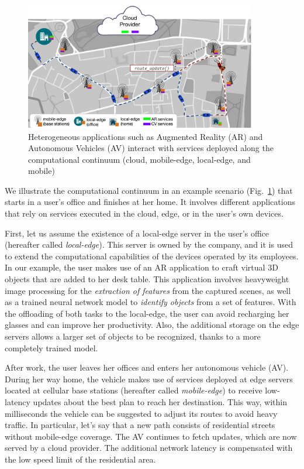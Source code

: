 \begin{figure}[tbp]
	\includegraphics[width=0.9\textwidth]{figs/Continuum-Scenario}
	\caption{Heterogeneous applications such as Augmented Reality (AR) and Autonomous Vehicles (AV) interact with services deployed along the computational continuum (cloud, mobile-edge, local-edge, and mobile)}
	\label{fig:continuum-scenario}
\end{figure}

We illustrate the computational continuum in an example scenario (Fig.~\ref{fig:continuum-scenario}) that starts in a user's office and finishes at her home. It involves different applications that rely on services executed in the cloud, edge, or in the user's own devices. 

First, let us assume the existence of a local-edge server in the user's office (hereafter called \textit{local-edge}). This server is owned by the company, and it is used to extend the computational capabilities of the devices operated by its employees. In our example, the user makes use of an AR application to craft virtual 3D objects that are added to her desk table. This application involves heavyweight image processing for the \textit{extraction of features} from the captured scenes, as well as a trained neural network model to \textit{identify objects} from a set of features. With the offloading of both tasks to the local-edge, the user can avoid recharging her glasses and can improve her productivity. Also, the additional storage on the edge servers allows a larger set of objects to be recognized, thanks to a more completely trained model.

After work, the user leaves her offices and enters her autonomous vehicle (AV). During her way home, the vehicle makes use of services deployed at edge servers located at cellular base stations (hereafter called \textit{mobile-edge}) to receive low-latency updates about the best plan to reach her destination. This way, within milliseconds the vehicle can be suggested to adjust its routes to avoid heavy traffic. In particular, let's say that a new path consists of residential streets without mobile-edge coverage. The AV continues to fetch updates, which are now served by a cloud provider. The additional network latency is compensated with the low speed limit of the residential area.

